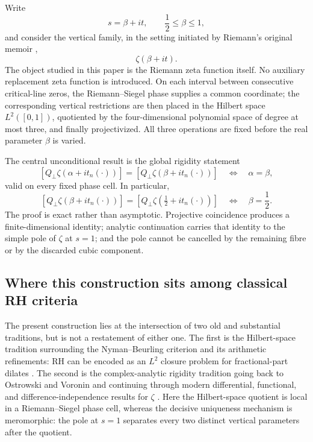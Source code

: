 \documentclass[11pt]{amsart}
\numberwithin{equation}{section}
\begin{document}
Write
\begin{equation}
 s=\beta+it,
 \qquad
 \frac12\leq\beta\leq1,
 \label{eq:s-beta-t}
\end{equation}
and consider the vertical family, in the setting initiated by Riemann's original memoir \cite{Riemann1859},
\begin{equation}
 \boxed{\zeta(\beta+it).}
 \label{eq:vertical-zeta-family}
\end{equation}
The object studied in this paper is the Riemann zeta function itself.  No
auxiliary replacement zeta function is introduced.  On each interval between
consecutive critical-line zeros, the Riemann--Siegel phase supplies a common
coordinate; the corresponding vertical restrictions are then placed in the
Hilbert space $L^2([0,1])$, quotiented by the four-dimensional polynomial
space of degree at most three, and finally projectivized.  All three operations
are fixed before the real parameter $\beta$ is varied.

The central unconditional result is the global rigidity statement
\begin{equation}
\boxed{
 [Q_\perp\zeta(\alpha+i t_n(\cdot))]
 =
 [Q_\perp\zeta(\beta+i t_n(\cdot))]
 \quad\Longleftrightarrow\quad
 \alpha=\beta,
}
\label{eq:intro-global-rigidity}
\end{equation}
valid on every fixed phase cell.  In particular,
\begin{equation}
\boxed{
 [Q_\perp\zeta(\beta+i t_n(\cdot))]
 =
 [Q_\perp\zeta(\tfrac12+i t_n(\cdot))]
 \quad\Longleftrightarrow\quad
 \beta=\frac12.
}
\label{eq:intro-critical-rigidity}
\end{equation}
The proof is exact rather than asymptotic.  Projective coincidence produces a
finite-dimensional identity; analytic continuation carries that identity to
the simple pole of $\zeta$ at $s=1$; and the pole cannot be cancelled by the
remaining fibre or by the discarded cubic component.

\subsection{Where this construction sits among classical RH criteria}
\label{subsec:intro-literature-position}

The present construction lies at the intersection of two old and substantial
traditions, but is not a restatement of either one.  The first is the
Hilbert-space tradition surrounding the Nyman--Beurling criterion and its
arithmetic refinements: RH can be encoded as an $L^2$ closure problem for
fractional-part dilates \cite{Nyman1950,Beurling1955,BaezDuarte2000,BaezDuarte2002,
BaezDuarte2003,Burnol2002}.  The second is the complex-analytic rigidity tradition going
back to Ostrowski and Voronin and continuing through modern differential,
functional, and difference-independence results for $\zeta$
\cite{Ostrowski1920,Voronin1973,KaczorowskiPerelli1998,ChiangFeng2006,Lu2024,
KorolevLaurincikas2025}.  Here the Hilbert-space quotient is local in a
Riemann--Siegel phase cell, whereas the decisive uniqueness mechanism is
meromorphic: the pole at $s=1$ separates every two distinct vertical
parameters after the quotient.
\end{document}
